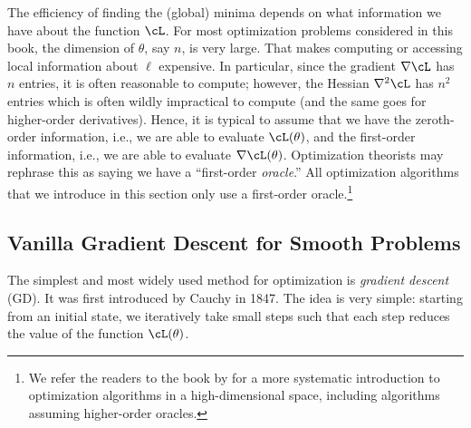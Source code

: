 \documentclass[../../book-main.tex]{subfiles}
\begin{document}
The efficiency of finding the (global) minima depends on what information we have about the function \(\cL\). For most optimization problems considered in this book, the dimension of \(\theta\), say \(n\), is very large. That makes computing or accessing local information about \(\ell\) expensive. In particular, since the gradient \(\nabla \cL\) has \(n\) entries, it is often reasonable to compute; however, the Hessian \(\nabla^{2} \cL\) has \(n^{2}\) entries which is often wildly impractical to compute (and the same goes for higher-order derivatives). Hence, it is typical to assume that we have the zeroth-order information, i.e., we are able to evaluate \(\cL(\theta)\), and the first-order information, i.e., we are able to evaluate \(\nabla \cL(\theta)\). Optimization theorists may rephrase this as saying we have a ``first-order \textit{oracle}.'' All optimization algorithms that we introduce in this section only use a first-order oracle.\footnote{We refer the readers to the book by \cite{Wright-Ma-2022} for a more systematic introduction to optimization algorithms in a high-dimensional space, including algorithms assuming higher-order oracles.}  

\subsection{Vanilla Gradient Descent for Smooth Problems}

The simplest and most widely used method for optimization is \textit{gradient descent} (GD). It was first introduced by Cauchy in 1847. The idea is very simple: starting from an initial state, we iteratively take small steps such that each step reduces the value of the function $\cL(\theta)$. 
\end{document}
